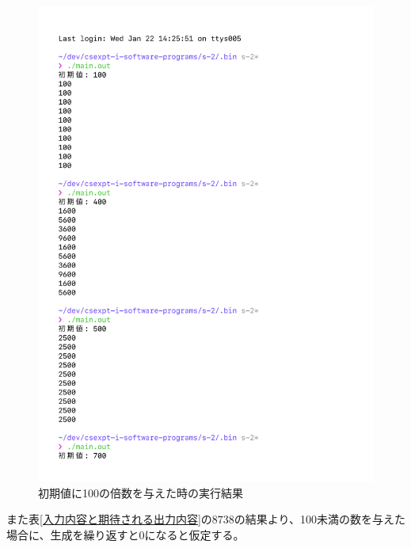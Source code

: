 \begin{figure}[H]
    \ContinuedFloat
    \centering
    \includegraphics[width=0.8\hsize, pagebox=mediabox, page=3]{main_result2_img.pdf}
    \caption{初期値に100の倍数を与えた時の実行結果}
    \label{初期値に100の倍数を与えた時の実行結果}
\end{figure}

また表\ref{入力内容と期待される出力内容}の$8738$の結果より、100未満の数を与えた場合に、生成を繰り返すと$0$になると仮定する。


